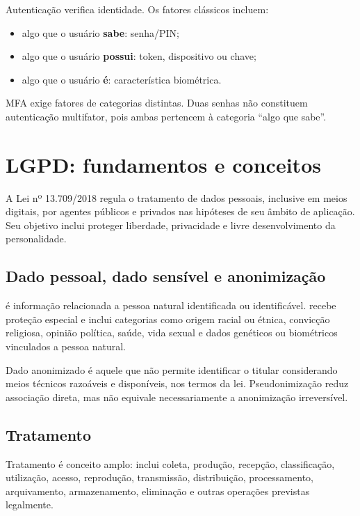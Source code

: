 Autenticação verifica identidade. Os fatores clássicos incluem:
\begin{itemize}
\item algo que o usuário \textbf{sabe}: senha/PIN;
\item algo que o usuário \textbf{possui}: token, dispositivo ou chave;
\item algo que o usuário \textbf{é}: característica biométrica.
\end{itemize}

MFA exige fatores de categorias distintas. Duas senhas não constituem autenticação multifator, pois ambas pertencem à categoria ``algo que sabe''.

\section{LGPD: fundamentos e conceitos}

A Lei nº 13.709/2018 regula o tratamento de dados pessoais, inclusive em meios digitais, por agentes públicos e privados nas hipóteses de seu âmbito de aplicação. Seu objetivo inclui proteger liberdade, privacidade e livre desenvolvimento da personalidade.

\subsection{Dado pessoal, dado sensível e anonimização}

 é informação relacionada a pessoa natural identificada ou identificável.  recebe proteção especial e inclui categorias como origem racial ou étnica, convicção religiosa, opinião política, saúde, vida sexual e dados genéticos ou biométricos vinculados a pessoa natural.

Dado anonimizado é aquele que não permite identificar o titular considerando meios técnicos razoáveis e disponíveis, nos termos da lei. Pseudonimização reduz associação direta, mas não equivale necessariamente a anonimização irreversível.

\subsection{Tratamento}

Tratamento é conceito amplo: inclui coleta, produção, recepção, classificação, utilização, acesso, reprodução, transmissão, distribuição, processamento, arquivamento, armazenamento, eliminação e outras operações previstas legalmente.


